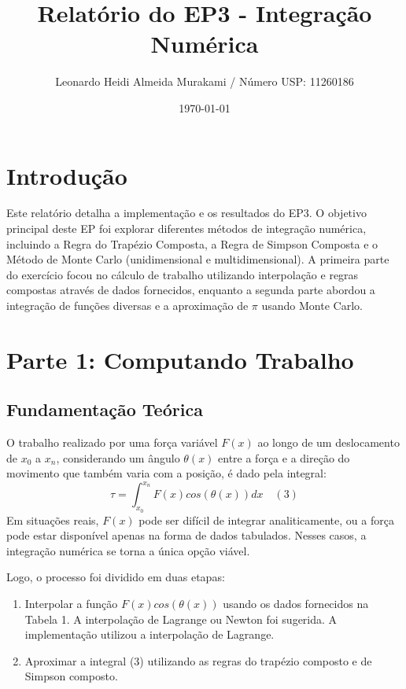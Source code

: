 \documentclass{article}
\begin{document}
\title{Relatório do EP3 - Integração Numérica}
\author{Leonardo Heidi Almeida Murakami / Número USP: 11260186}
\date{\today}

\maketitle

\section{Introdução}
Este relatório detalha a implementação e os resultados do EP3. O objetivo principal deste EP foi explorar diferentes métodos de integração numérica, incluindo a Regra do Trapézio Composta, a Regra de Simpson Composta e o Método de Monte Carlo (unidimensional e multidimensional). A primeira parte do exercício focou no cálculo de trabalho utilizando interpolação e regras compostas através de dados fornecidos, enquanto a segunda parte abordou a integração de funções diversas e a aproximação de $\pi$ usando Monte Carlo.

\section{Parte 1: Computando Trabalho}

\subsection{Fundamentação Teórica}
O trabalho realizado por uma força variável $F(x)$ ao longo de um deslocamento de $x_0$ a $x_n$, considerando um ângulo $\theta(x)$ entre a força e a direção do movimento que também varia com a posição, é dado pela integral:
$$\tau = \int_{x_0}^{x_n} F(x)cos(\theta(x))dx \quad (3)$$
Em situações reais, $F(x)$ pode ser difícil de integrar analiticamente, ou a força pode estar disponível apenas na forma de dados tabulados. Nesses casos, a integração numérica se torna a única opção viável.

Logo, o processo foi dividido em duas etapas:
\begin{enumerate}
    \item Interpolar a função $F(x)cos(\theta(x))$ usando os dados fornecidos na Tabela 1. A interpolação de Lagrange ou Newton foi sugerida. A implementação utilizou a interpolação de Lagrange.
    \item Aproximar a integral (3) utilizando as regras do trapézio composto e de Simpson composto.
\end{enumerate}
\end{document}
